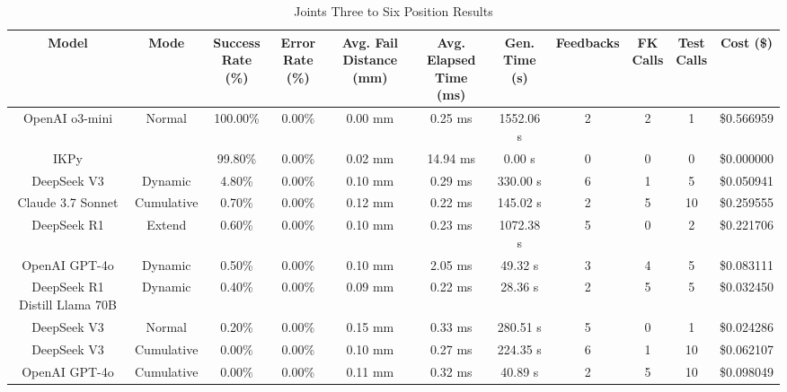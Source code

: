 \begin{table}[H]
\tiny
\renewcommand{\arraystretch}{1.2}
\caption{Joints Three to Six Position Results}
\begin{center}
\begin{tabular}{|c|c|c|c|c|c|c|c|c|c|c|}
    \hline
    \textbf{Model} & 
    \textbf{Mode} & 
    \makecell{\textbf{Success}\\\textbf{Rate (\%)}} &
    \makecell{\textbf{Error}\\\textbf{Rate (\%)}} &
    \makecell{\textbf{Avg. Fail}\\\textbf{Distance (mm)}} &
    \makecell{\textbf{Avg. Elapsed}\\\textbf{Time (ms)}} &
    \makecell{\textbf{Gen.}\\\textbf{Time (s)}} &
    \textbf{Feedbacks} &
    \makecell{\textbf{FK}\\\textbf{Calls}} &
    \makecell{\textbf{Test}\\\textbf{Calls}} &
    \textbf{Cost (\$)} \\
    \hline
    OpenAI o3-mini & Normal & 100.00\% & 0.00\% & 0.00 mm & 0.25 ms & 1552.06 s & 2 & 2 & 1 & \$0.566959 \\
    \hline
    IKPy &  & 99.80\% & 0.00\% & 0.02 mm & 14.94 ms & 0.00 s & 0 & 0 & 0 & \$0.000000 \\
    \hline
    DeepSeek V3 & Dynamic & 4.80\% & 0.00\% & 0.10 mm & 0.29 ms & 330.00 s & 6 & 1 & 5 & \$0.050941 \\
    \hline
    Claude 3.7 Sonnet & Cumulative & 0.70\% & 0.00\% & 0.12 mm & 0.22 ms & 145.02 s & 2 & 5 & 10 & \$0.259555 \\
    \hline
    DeepSeek R1 & Extend & 0.60\% & 0.00\% & 0.10 mm & 0.23 ms & 1072.38 s & 5 & 0 & 2 & \$0.221706 \\
    \hline
    OpenAI GPT-4o & Dynamic & 0.50\% & 0.00\% & 0.10 mm & 2.05 ms & 49.32 s & 3 & 4 & 5 & \$0.083111 \\
    \hline
    DeepSeek R1 Distill Llama 70B & Dynamic & 0.40\% & 0.00\% & 0.09 mm & 0.22 ms & 28.36 s & 2 & 5 & 5 & \$0.032450 \\
    \hline
    DeepSeek V3 & Normal & 0.20\% & 0.00\% & 0.15 mm & 0.33 ms & 280.51 s & 5 & 0 & 1 & \$0.024286 \\
    \hline
    DeepSeek V3 & Cumulative & 0.00\% & 0.00\% & 0.10 mm & 0.27 ms & 224.35 s & 6 & 1 & 10 & \$0.062107 \\
    \hline
    OpenAI GPT-4o & Cumulative & 0.00\% & 0.00\% & 0.11 mm & 0.32 ms & 40.89 s & 2 & 5 & 10 & \$0.098049 \\

\end{tabular}
\end{center}
\end{table}
